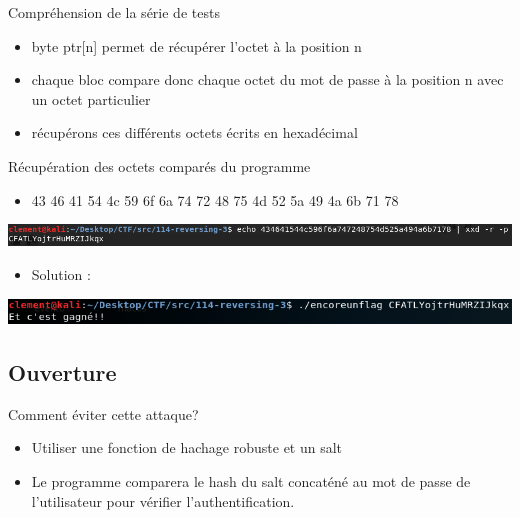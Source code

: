 \documentclass{beamer}
\begin{document}
	\begin{frame}
		\begin{block}{Compréhension de la série de tests}
			\begin{itemize}
				\item byte ptr[n] permet de récupérer l’octet à la position n
				\item chaque bloc compare donc chaque octet du mot de passe à la position n avec un octet particulier
				\item récupérons ces différents octets écrits en hexadécimal
			\end{itemize}
		\end{block}
		\begin{exampleblock}{Récupération des octets comparés du programme}
			\begin{itemize}
			\item 43 46 41 54 4c 59 6f 6a 74 72 48 75 4d 52 5a 49 4a 6b 71 78
			\end{itemize}
			\begin{center}
			\includegraphics[scale=0.4]{./pictures/114-reversing-3-6.PNG}
			\end{center}
			\begin{itemize}
				\item Solution :
			\end{itemize}
			\begin{center}
				\includegraphics[scale=0.4]{./pictures/114-reversing-3-5.PNG}
			\end{center}
		\end{exampleblock}
	\end{frame}

	\subsection{Ouverture}

	\begin{frame}
	\begin{block}{Comment éviter cette attaque?}
		\begin{itemize}
		\item Utiliser une fonction de hachage robuste et un salt
		\item Le programme comparera le hash du salt concaténé au mot de passe de l'utilisateur pour vérifier l'authentification.
		\end{itemize}
	\end{block}
	\end{frame}
\end{document}
